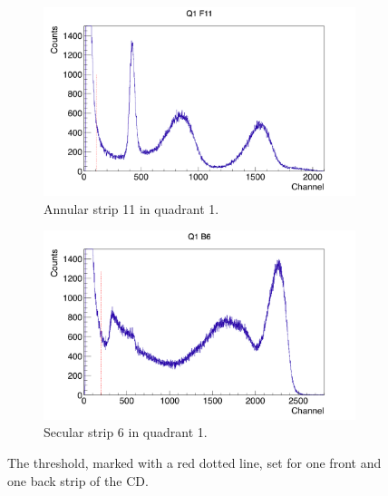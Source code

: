 \documentclass[twoside,english]{uiofysmaster/uiofysmaster}
\begin{document}
\begin{figure}[ht]
	\centering
	\begin{subfigure}{\textwidth}
		\centering
		\includegraphics[width=\textwidth]{../Plots/plotting/Threshold_Q1_f11.png}
		\caption{Annular strip 11 in quadrant 1.}
		\label{fig:Threshold_f}
	\end{subfigure}
	\begin{subfigure}{\textwidth}
		\centering
		\includegraphics[width=\textwidth]{../Plots/plotting/Threshold_Q1_b6.png}
		\caption{Secular strip 6 in quadrant 1.}
		\label{fig:Threshold_b}
	\end{subfigure}
	\caption{The threshold, marked with a red dotted line, set for one front and one back strip of the CD.}
	\label{fig:Threshold}
\end{figure}
\end{document}

